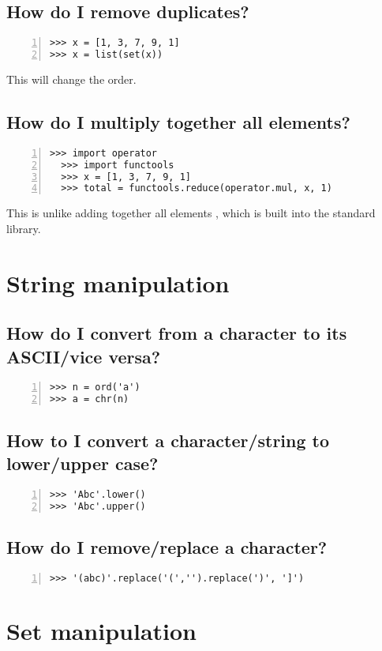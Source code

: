 \documentclass[12pt]{article}
\begin{document}
\subsection{How do I remove duplicates?}
\begin{lstlisting}[numbers=left]
>>> x = [1, 3, 7, 9, 1]
>>> x = list(set(x))
\end{lstlisting}
This will change the order.

\subsection{How do I multiply together all elements?}
\begin{lstlisting}[numbers=left]
  >>> import operator
  >>> import functools
  >>> x = [1, 3, 7, 9, 1]
  >>> total = functools.reduce(operator.mul, x, 1)
\end{lstlisting}
This is unlike adding together all elements , which is built into the standard library.

\section{String manipulation}
\subsection{How do I convert from a character to its ASCII/vice versa?}
\begin{lstlisting}[numbers=left]
>>> n = ord('a')
>>> a = chr(n)
\end{lstlisting}

\subsection{How to I convert a character/string to lower/upper case?}
\begin{lstlisting}[numbers=left]
>>> 'Abc'.lower()
>>> 'Abc'.upper()
\end{lstlisting}

\subsection{How do I remove/replace a character?}
\begin{lstlisting}[numbers=left]
>>> '(abc)'.replace('(','').replace(')', ']')
\end{lstlisting}
  
\section{Set manipulation}
\end{document}
